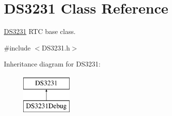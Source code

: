 \hypertarget{class_d_s3231}{}\section{D\+S3231 Class Reference}
\label{class_d_s3231}


\hyperlink{class_d_s3231}{D\+S3231} R\+TC base class.  




{\ttfamily \#include $<$D\+S3231.\+h$>$}

Inheritance diagram for D\+S3231\+:\begin{figure}[H]
\begin{center}
\leavevmode
\includegraphics[height=2.000000cm]{class_d_s3231}
\end{center}
\end{figure}
